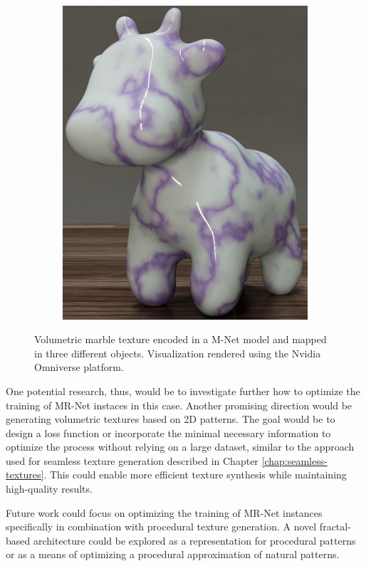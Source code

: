 \begin{figure}[h]
\begin{subfigure}[b]{0.32\textwidth}
       \includegraphics[width=\textwidth]{img/ch7/spot_mrnet.0101.png}
       \caption{}
   \end{subfigure}
   \caption{Volumetric marble texture encoded in a M-Net model and mapped in three different objects. Visualization rendered using the Nvidia Omniverse platform.}
   \label{f:volumetric-texture}
\end{figure}

One potential research, thus, would be to investigate further how to optimize the training of MR-Net instaces in this case. Another promising direction would be generating volumetric textures based on 2D patterns. The goal would be to design a loss function or incorporate the minimal necessary information to optimize the process without relying on a large dataset, similar to the approach used for seamless texture generation described in Chapter \ref{chap:seamless-textures}. This could enable more efficient texture synthesis while maintaining high-quality results.

Future work could focus on optimizing the training of MR-Net instances specifically in combination with procedural texture generation. A novel fractal-based architecture could be explored as a representation for procedural patterns or as a means of optimizing a procedural approximation of natural patterns.

